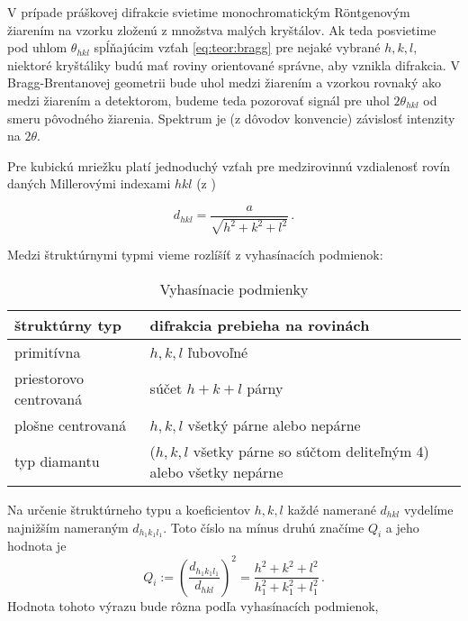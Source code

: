\documentclass[a4paper, 10pt]{article}
\begin{document}
V prípade práškovej difrakcie svietime monochromatickým R\"ontgenovým žiarením na vzorku zloženú z množstva malých kryštálov. Ak teda posvietime pod uhlom $\theta_{hkl}$ spĺňajúcim vzťah \ref{eq:teor:bragg} pre nejaké vybrané $h, k, l$, niektoré kryštáliky budú mať roviny orientované správne, aby vznikla difrakcia. V Bragg-Brentanovej geometrii bude uhol medzi žiarením a vzorkou rovnaký ako medzi žiarením a detektorom, budeme teda pozorovať signál pre uhol $2\theta_{hkl}$ od smeru pôvodného žiarenia. Spektrum je (z dôvodov konvencie) závislosť intenzity na $2\theta$.

Pre kubickú mriežku platí jednoduchý vzťah pre medzirovinnú vzdialenosť rovín daných Millerovými indexami $hkl$ (z \cite{stud})

\begin{equation}
\label{eq:teor:medzi_rovinami}
d_{hkl} = \frac{a}{\sqrt{h^2 + k^2 + l^2}}\,.
\end{equation}

Medzi štruktúrnymi typmi vieme rozlíšíť z vyhasínacích podmienok:


\begin{table}[h!]
\centering
\begin{tabular}{l|l}
štruktúrny typ & 
difrakcia prebieha na rovinách 
\\
\midrule 
primitívna  &   $h, k, l$ ľubovoľné \\
priestorovo centrovaná & súčet $h + k + l$ párny \\
plošne centrovaná & $h, k, l$ všetký párne alebo nepárne \\
typ diamantu & ($h, k, l $ všetky párne so súčtom deliteľným 4) alebo všetky nepárne
\end{tabular}
\newline
\vspace*{2pt}
\caption{Vyhasínacie podmienky \label{tab:vyhasinanie}
}
\end{table}

Na určenie štruktúrneho typu a koeficientov $h, k, l$ každé namerané $d_{hkl}$ vydelíme najnižším nameraným $d_{h_1 k_1 l_1}$. Toto číslo na mínus druhú značíme $Q_i$ a jeho hodnota je 
\begin{equation}
\label{eq:teor:Qi}
Q_i := \left(\frac{d_{h_1 k_1 l_1}}{d_{hkl}}\right)^2 = \frac{h^2 + k^2 + l^2}{h_1^2 + k_1^2 + l_1^2}\,.
\end{equation}
Hodnota tohoto výrazu bude rôzna podľa vyhasínacích podmienok, 
\end{document}
